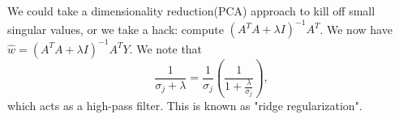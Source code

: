 \documentclass[11pt]{scrartcl}
\begin{document}
 We could take a dimensionality reduction(PCA) approach to kill off small singular values, or we take a hack: compute $(A^TA + \lambda I)^{-1}A^T$.  We now have $\hat{w}  = (A^TA + \lambda I)^{-1}A^T Y$.  We note that 
$$\frac{1}{\sigma_j + \lambda} = \frac{1}{\sigma_j}\left (\frac{1}{1 + \frac{\lambda}{\sigma_j}}\right ),$$
which acts as a high-pass filter.  This is known as "ridge regularization".
\end{document}
